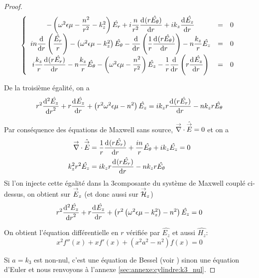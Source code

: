 \begin{proof}
    \begin{equation*}
      \left\lbrace
      \begin{array}{ccc}
        -\left(\w^2\eps\mu -\frac{n^2}{r^2}  - k_z^2\right)\hat{E_r}  +i\frac{n}{r^2}\ddp{r}{(r\hat{E_\theta})}  +i k_z\ddp{r}{\hat{E_z}} & = & 0
        \\
        in\ddp{r}{}\left(\frac{\hat{E_r}}{r}\right) -\left(\w^2\eps\mu - k_z^2\right)\hat{E_\theta} - \ddp{r}{}\left(\frac{1}{r}\ddp{r}{(r\hat{E_\theta})}\right)  - n\frac{k_z}{r}\hat{E_z} & = & 0
        \\
        i\frac{k_z}{r}\ddp{r}{(r\hat{E_r})}  - n\frac{k_z}{r}\hat{E_\theta}  -\left(\w^2\eps\mu - \frac{n^2}{r^2} \right)\hat{E_z} - \frac{1}{r}\ddp{r}{}\left(r\ddp{r}{\hat{E_z}}\right) & = & 0
      \end{array}
      \right.
    \end{equation*}

    De la troisième égalité, on a
    \begin{equation*}
    r^2 \ddp[2]{r}{\hat{E_z}} + r\ddp{r}{\hat{E_z}} + \left(r^2\w^2\eps\mu - n^2\right)\hat{E_z} =ik_zr\ddp{r}{(r\hat{E_r})} -  nk_zr\hat{E_\theta}
    \end{equation*}

    Par conséquence des équations de Maxwell sans source, \(\vdiv \hat \vE = 0\) et on a
    \begin{align*}
      \vdiv\hat \vE &= \frac{1}{r}\ddp{r}{(r\hat{E_r})} + \frac{in}{r}\hat{E_\theta} + ik_z\hat{E_z} = 0
      \\
      k_z^2r^2 \hat{E_z} &= ik_zr\ddp{r}{(r\hat{E_r})} - nk_zr\hat{E_\theta}
    \end{align*}
    Si l'on injecte cette égalité dans la 3\ieme composante du système de Maxwell couplé ci-dessus, on obtient sur \(\vE_z\) (et donc aussi sur \(\vH_z\))
    \begin{equation*}
      r^2 \ddp[2]{r}{\hat{E_z}} + r\ddp{r}{\hat{E_z}} + \left(r^2\left(\w^2\eps\mu - k_z^2\right) - n^2\right)\hat{E_z} = 0
    \end{equation*}

    On obtient l'équation différentielle en \(r\) vérifiée par \(\hat{E_z}\) et aussi \(\hat{H_z}\):
    \begin{equation*}
      x^2 f''(x) + xf'(x) + \left(x^2a^2 - n^2\right)f(x) = 0
    \end{equation*}

    Si \(a = k_3\) est non-nul, c'est une équation de Bessel (voir \cite[eq (6.80)]{bowman_introduction_1958}) sinon une équation d'Euler et nous renvoyons à l'annexe \ref{sec:annexe:cylindre:k3_nul}.


\end{proof}
